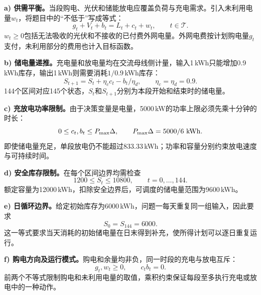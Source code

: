 \textbf{a) 供需平衡。}当段购电、光伏和储能放电应覆盖负荷与充电需求。引入未利用电量$w_t$，将题目中的“不低于”写成等式：
\begin{equation}
 g_t+V_t+b_t=L_t+c_t+w_t,\qquad t\in\mathcal T.\label{eq:balance}
\end{equation}
$w_t\ge0$包括无法吸收的光伏和不接收的已付费外网电量。外网电费按计划购电量$g_t$支付，未利用部分的费用也计入目标函数。

\textbf{b) 储电量递推。}充电量和放电量均在交流母线侧计量，输入1\,kWh只能增加0.9\,kWh库存，输出1\,kWh则需要消耗$1/0.9$\,kWh库存：
\begin{equation}
 S_{t+1}=S_t+\eta_c c_t-b_t/\eta_d,\qquad \eta_c=\eta_d=0.9.\label{eq:soc}
\end{equation}
144个区间对应145个状态，$S_t$和$S_{t+1}$分别为本段开始和结束时的储电量。

\textbf{c) 充放电功率限制。}由于决策变量是电量，5000\,kW的功率上限必须先乘十分钟的时长：
\begin{equation}
 0\le c_t,b_t\le P_{\max}\Delta,\qquad P_{\max}\Delta=5000/6\ \mathrm{kWh}.\label{eq:bounds}
\end{equation}
即使储电量充足，单段放电仍不能超过833.33\,kWh；功率和容量分别约束放电速度与可持续时间。

\textbf{d) 安全库存限制。}在每个区间边界均需检查
\begin{equation}
 1200\le S_t\le10800,\qquad t=0,\ldots,144.\label{eq:inventory}
\end{equation}
额定容量为12000\,kWh，扣除安全边界后，可调度的储电量范围为9600\,kWh。

\textbf{e) 日循环边界。}给定初始库存为6000\,kWh，问题一每天重复同一组输入，因此要求
\begin{equation}
 S_0=S_{144}=6000.\label{eq:cycle}
\end{equation}
这一等式要求当天消耗的初始储电量在日末得到补充，使所得计划可以逐日重复运行。

\textbf{f) 购电方向及运行模式。}购电和余量均非负，同一时段的充电与放电互斥：
\begin{equation}
 g_t,w_t\ge0,\qquad c_tb_t=0.\label{eq:nonnegative}
\end{equation}
前两个不等式限制购电和未利用电量的取值，乘积约束保证每段至多执行充电或放电中的一种动作。
